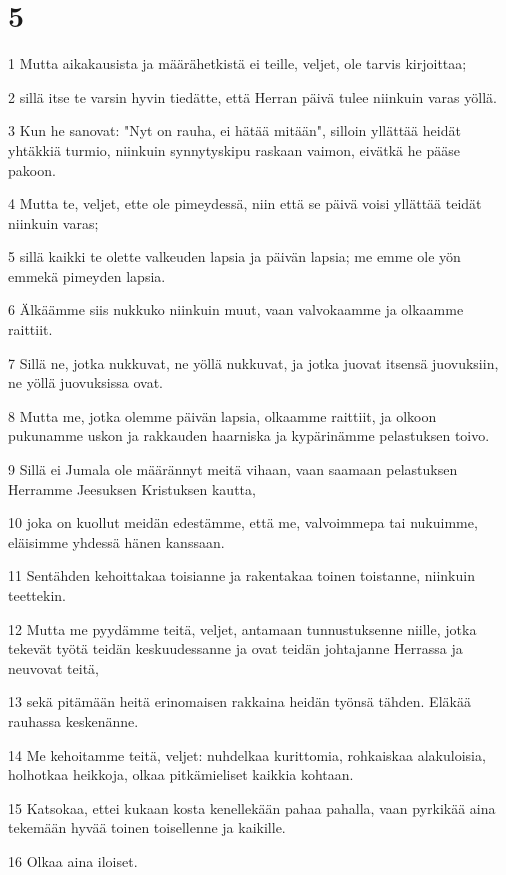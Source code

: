 \chapter{5}

\par 1 Mutta aikakausista ja määrähetkistä ei teille, veljet, ole tarvis kirjoittaa;
\par 2 sillä itse te varsin hyvin tiedätte, että Herran päivä tulee niinkuin varas yöllä.
\par 3 Kun he sanovat: "Nyt on rauha, ei hätää mitään", silloin yllättää heidät yhtäkkiä turmio, niinkuin synnytyskipu raskaan vaimon, eivätkä he pääse pakoon.
\par 4 Mutta te, veljet, ette ole pimeydessä, niin että se päivä voisi yllättää teidät niinkuin varas;
\par 5 sillä kaikki te olette valkeuden lapsia ja päivän lapsia; me emme ole yön emmekä pimeyden lapsia.
\par 6 Älkäämme siis nukkuko niinkuin muut, vaan valvokaamme ja olkaamme raittiit.
\par 7 Sillä ne, jotka nukkuvat, ne yöllä nukkuvat, ja jotka juovat itsensä juovuksiin, ne yöllä juovuksissa ovat.
\par 8 Mutta me, jotka olemme päivän lapsia, olkaamme raittiit, ja olkoon pukunamme uskon ja rakkauden haarniska ja kypärinämme pelastuksen toivo.
\par 9 Sillä ei Jumala ole määrännyt meitä vihaan, vaan saamaan pelastuksen Herramme Jeesuksen Kristuksen kautta,
\par 10 joka on kuollut meidän edestämme, että me, valvoimmepa tai nukuimme, eläisimme yhdessä hänen kanssaan.
\par 11 Sentähden kehoittakaa toisianne ja rakentakaa toinen toistanne, niinkuin teettekin.
\par 12 Mutta me pyydämme teitä, veljet, antamaan tunnustuksenne niille, jotka tekevät työtä teidän keskuudessanne ja ovat teidän johtajanne Herrassa ja neuvovat teitä,
\par 13 sekä pitämään heitä erinomaisen rakkaina heidän työnsä tähden. Eläkää rauhassa keskenänne.
\par 14 Me kehoitamme teitä, veljet: nuhdelkaa kurittomia, rohkaiskaa alakuloisia, holhotkaa heikkoja, olkaa pitkämieliset kaikkia kohtaan.
\par 15 Katsokaa, ettei kukaan kosta kenellekään pahaa pahalla, vaan pyrkikää aina tekemään hyvää toinen toisellenne ja kaikille.
\par 16 Olkaa aina iloiset.
